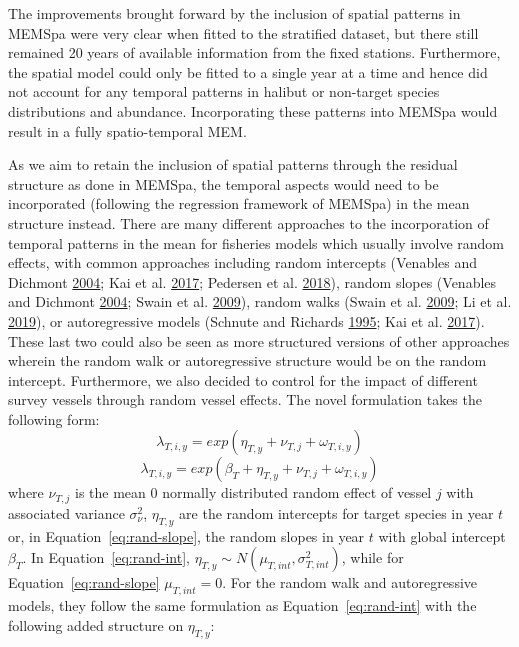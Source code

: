 \documentclass[12pt]{article}\usepackage[]{graphicx}\usepackage[]{color}
\begin{document}
The improvements brought forward by the inclusion of spatial patterns in MEMSpa were very clear when fitted to the stratified dataset, but there still remained 20 years of available information from the fixed stations. Furthermore, the spatial model could only be fitted to a single year at a time and hence did not account for any temporal patterns in halibut or non-target species distributions and abundance. Incorporating these patterns into MEMSpa would result in a fully spatio-temporal MEM.

As we aim to retain the inclusion of spatial patterns through the residual structure as done in MEMSpa, the temporal aspects would need to be incorporated (following the regression framework of MEMSpa) in the mean structure instead. There are many different approaches to the incorporation of temporal patterns in the mean for fisheries models which usually involve random effects, with common approaches including random intercepts (Venables and Dichmont \protect\hyperlink{ref-Venables2004}{2004}; Kai et al. \protect\hyperlink{ref-Kai2017}{2017}; Pedersen et al. \protect\hyperlink{ref-Pedersen2018}{2018}), random slopes (Venables and Dichmont \protect\hyperlink{ref-Venables2004}{2004}; Swain et al. \protect\hyperlink{ref-Swain2009}{2009}), random walks (Swain et al. \protect\hyperlink{ref-Swain2009}{2009}; Li et al. \protect\hyperlink{ref-Li2019}{2019}), or autoregressive models (Schnute and Richards \protect\hyperlink{ref-Schnute1995}{1995}; Kai et al. \protect\hyperlink{ref-Kai2017}{2017}). These last two could also be seen as more structured versions of other approaches wherein the random walk or autoregressive structure would be on the random intercept. Furthermore, we also decided to control for the impact of different survey vessels through random vessel effects. The novel formulation takes the following form:
\begin{equation}\label{eq:rand-int}
\lambda_{T,i,y} = exp(\eta_{T,y}+ \nu_{T,j}+\omega_{T,i,y})
\end{equation} \begin{equation}\label{eq:rand-slope}
\lambda_{T,i,y} = exp(\beta_T+\eta_{T,y}+ \nu_{T,j}+\omega_{T,i,y})
\end{equation}
where \(\nu_{T,j}\) is the mean 0 normally distributed random effect of vessel \(j\) with associated variance \(\sigma_\nu^2\), \(\eta_{T,y}\) are the random intercepts for target species in year \(t\) or, in Equation~\ref{eq:rand-slope}, the random slopes in year \(t\) with global intercept \(\beta_T\). In Equation~\ref{eq:rand-int}, \(\eta_{T,y} \sim N(\mu_{T,int},\sigma_{T,int}^2)\), while for Equation~\ref{eq:rand-slope} \(\mu_{T,int}=0\). For the random walk and autoregressive models, they follow the same formulation as Equation~\ref{eq:rand-int} with the following added structure on \(\eta_{T,y}\):
\end{document}
